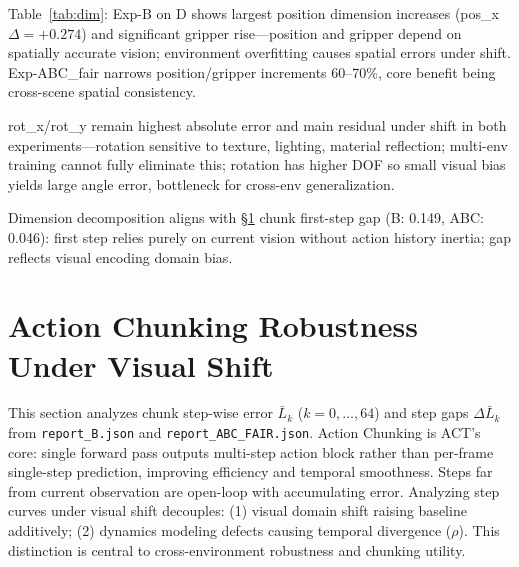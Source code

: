 \documentclass[10pt,twocolumn,letterpaper]{article}
\newcommand{\tabref}[1]{Table~\ref{#1}}
\begin{document}
\begin{table}[H]
  \centering
  \caption{Per-dimension in-dist and D zero-shot L1}
  \label{tab:dim}
  \small
  \setlength{\tabcolsep}{4pt}
\end{table}

\tabref{tab:dim}: Exp-B on D shows largest position dimension increases (pos\_x $\Delta{=}+0.274$) and significant gripper rise---position and gripper depend on spatially accurate vision; environment overfitting causes spatial errors under shift. Exp-ABC\_fair narrows position/gripper increments 60--70\%, core benefit being cross-scene spatial consistency.

rot\_x/rot\_y remain highest absolute error and main residual under shift in both experiments---rotation sensitive to texture, lighting, material reflection; multi-env training cannot fully eliminate this; rotation has higher DOF so small visual bias yields large angle error, bottleneck for cross-env generalization.

Dimension decomposition aligns with \S\ref{sec:chunking} chunk first-step gap (B: 0.149, ABC: 0.046): first step relies purely on current vision without action history inertia; gap reflects visual encoding domain bias.

\section{Action Chunking Robustness Under Visual Shift}
\label{sec:chunking}

This section analyzes chunk step-wise error $\bar{L}_k$ ($k{=}0,\ldots,64$) and step gaps $\Delta\bar{L}_k$ from \texttt{report\_B.json} and \texttt{report\_ABC\_FAIR.json}. Action Chunking is ACT's core: single forward pass outputs multi-step action block rather than per-frame single-step prediction, improving efficiency and temporal smoothness. Steps far from current observation are open-loop with accumulating error. Analyzing step curves under visual shift decouples: (1) visual domain shift raising baseline additively; (2) dynamics modeling defects causing temporal divergence ($\rho$). This distinction is central to cross-environment robustness and chunking utility.
\end{document}
